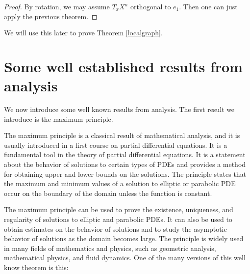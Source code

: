 \begin{proof}
	By rotation, we may assume $T_x X^n$ orthogonal to $e_1$. Then one can just apply the previous theorem. 
\end{proof}

We will use this later to prove Theorem \ref{localgraph}. 


\section{Some well established results from analysis}

We now introduce some well known results from analysis. The first result we introduce is the maximum principle.

The maximum principle is a classical result of mathematical analysis, and it is usually introduced in a first course on partial differential equations. It is a fundamental tool in the theory of partial differential equations. It is a statement about the behavior of solutions to certain types of PDEs and provides a method for obtaining upper and lower bounds on the solutions. The principle states that the maximum and minimum values of a solution to elliptic or parabolic PDE occur on the boundary of the domain unless the function is constant. 

The maximum principle can be used to prove the existence, uniqueness, and regularity of solutions to elliptic and parabolic PDEs. It can also be used to obtain estimates on the behavior of solutions and to study the asymptotic behavior of solutions as the domain becomes large. The principle is widely used in many fields of mathematics and physics, such as geometric analysis, mathematical physics, and fluid dynamics. One of the many versions of this well know theorem is this: 


